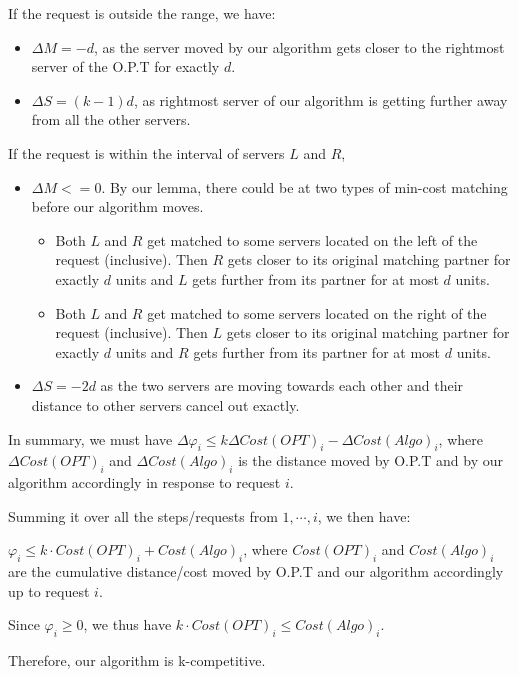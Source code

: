 \documentclass[11pt]{article}
\begin{document}
If the request is outside the range, we have:
\begin{itemize}
    \item $\Delta{M} = -d$, as the server moved by our algorithm gets closer to the rightmost server of the O.P.T for exactly $d$.
    \item $\Delta{S} = (k-1)d$, as rightmost server of our algorithm is getting further away from all the other servers.
\end{itemize}
If the request is within the interval of servers $L$ and $R$,
\begin{itemize}
    \item $\Delta{M} <= 0$. By our lemma, there could be at two types of min-cost matching before our algorithm moves. 
    \begin{itemize}
        \item Both $L$ and $R$ get matched to some servers located on the left of the request (inclusive). Then $R$ gets closer to its original matching partner for exactly $d$ units and $L$ gets further from its partner for at most $d$ units.
        \item Both $L$ and $R$ get matched to some servers located on the right of the request (inclusive). Then $L$ gets closer to its original matching partner for exactly $d$ units and $R$ gets further from its partner for at most $d$ units.
    \end{itemize}
    \item $\Delta{S} = -2d$ as the two servers are moving towards each other and their distance to other servers cancel out exactly.
\end{itemize}


In summary, we must have $\Delta{\varphi}_i \leq k \Delta{Cost(OPT)}_i - \Delta{Cost(Algo)}_i$, where $\Delta{Cost(OPT)}_i$ and $\Delta{Cost(Algo)}_i$ is the distance moved by O.P.T and by our algorithm accordingly in response to request $i$.

Summing it over all the steps/requests from $1, \cdots, i$, we then have:

$\varphi_i \leq k \cdot Cost(OPT)_i + Cost(Algo)_i$, where $Cost(OPT)_i$ and $Cost(Algo)_i$ are the cumulative distance/cost moved by O.P.T and our algorithm accordingly up to request $i$.

Since $\varphi_i \geq 0$, we thus have $ k \cdot Cost(OPT)_i \leq Cost(Algo)_i$.

Therefore, our algorithm is k-competitive. 
\end{document}
